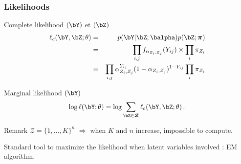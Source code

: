\documentclass{beamer}\usepackage[]{graphicx}\usepackage[]{color}
\begin{document}
\begin{frame}
  \frametitle{Likelihoods}

\begin{block}{Complete  likelihood $(\bY)$  et  $(\bZ)$}
 \begin{eqnarray}\label{eq:lik}
\ell_c(\bY,\bZ; \theta) &=& p(\bY | \bZ; \balpha) p(\bZ ; \boldsymbol\pi)\nonumber  \\
&=& \prod_{i,j} f_{\alpha_{Z_i,Z_j}}(Y_{ij}) \times   \prod_{i} \pi_{Z_i} \nonumber  \\
&=&  \prod_{i,j} \alpha_{Z_i,Z_j}^{Y_{ij}} (1-  \alpha_{Z_i,Z_j})^{1- Y_{ij}}    \prod_{i} \pi_{Z_i} \nonumber
\end{eqnarray}
 
 \end{block}
 

\begin{block}{Marginal likelihood $(\bY)$}
\begin{equation*}\label{eq:vraismarg}
\log \ell(\bY; \theta) =\log \sum_{\bZ \in \boldsymbol{\mathcal{Z}}} \ell_c(\bY,\bZ; \theta) \,.
\end{equation*}
\end{block}

  \begin{block}{Remark}
$\boldsymbol{\mathcal{Z}} =   \{1,\dots, K\}^{n}$  $\Rightarrow$ \color{black}  when  $K$ and $n$ increase, impossible to compute. 
 \end{block}
 
\alert{Standard tool to maximize the likelihood when latent variables involved} : EM  algorithm.  
 
 \end{frame}
\end{document}
